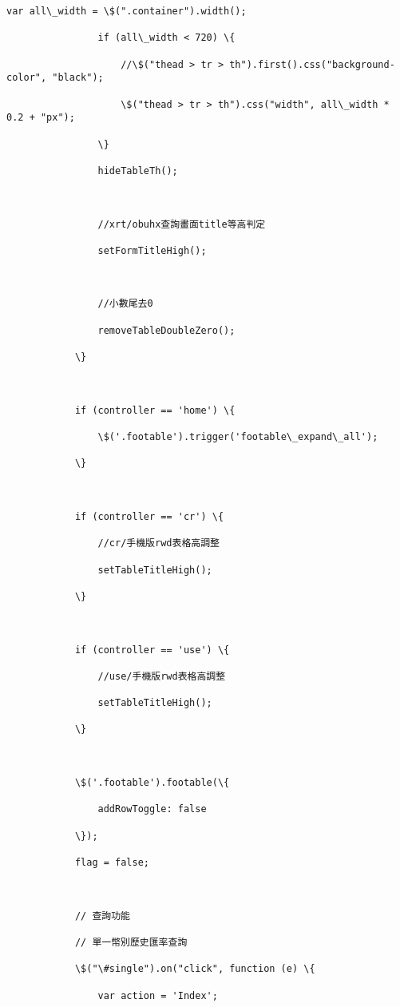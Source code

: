 \documentclass[11pt]{article}
\begin{document}
\begin{Verbatim}[commandchars=\\\{\}]
                var all\_width = \$(".container").width();

                if (all\_width < 720) \{

                    //\$("thead > tr > th").first().css("background-color", "black");

                    \$("thead > tr > th").css("width", all\_width * 0.2 + "px");

                \}

                hideTableTh();



                //xrt/obuhx查詢畫面title等高判定

                setFormTitleHigh();



                //小數尾去0

                removeTableDoubleZero();

            \}



            if (controller == 'home') \{

                \$('.footable').trigger('footable\_expand\_all');

            \}



            if (controller == 'cr') \{

                //cr/手機版rwd表格高調整

                setTableTitleHigh();

            \}



            if (controller == 'use') \{

                //use/手機版rwd表格高調整

                setTableTitleHigh();

            \}



            \$('.footable').footable(\{

                addRowToggle: false

            \});

            flag = false;



            // 查詢功能

            // 單一幣別歷史匯率查詢

            \$("\#single").on("click", function (e) \{

                var action = 'Index';


\end{Verbatim}
\end{document}
